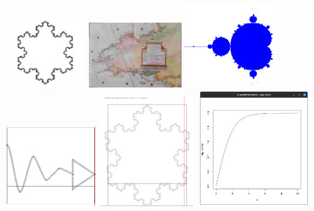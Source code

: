 \documentclass[11pt]{book}
\begin{document}
\clearpage%
\includegraphics[width=3.5cm, height=3cm]{./flocon4.pdf}
\clearpage%
\includegraphics[width=4.0cm]{./bretagne3.jpg}
\clearpage%
\includegraphics[width=4.0cm]{./mandelbrot.png}
\clearpage%
\includegraphics[width=4.0cm]{./imp.png}
\clearpage%
\includegraphics[width=4.0cm]{./snow.png}
\clearpage%
\includegraphics[width=5cm, height=5cm]{sigmoid}
\clearpage%
\end{document}
